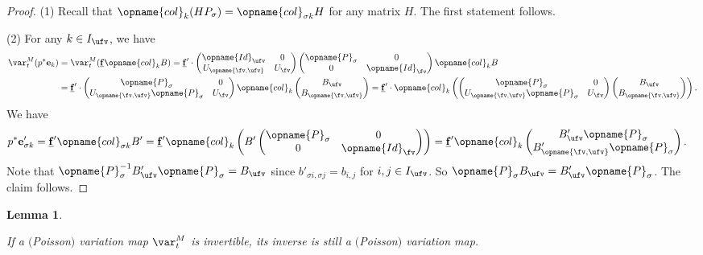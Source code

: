 \documentclass[pdftex]{sigma}
\newcommand{\Iufv}{I_{\ufv}}
\newcommand{\Id}{{\opname{Id}}}
\newcommand{\col}{\opname{col}}
\newcommand{\trans}{\opname{P}}
\newcommand{\ee}{\mathbf{e}}
\newcommand{\ff}{\mathbf{f}}
\newcommand{\uff}{\underline{\ff}}
\newcommand{\low}{\opname{\fv,\ufv}}
\numberwithin{equation}{section}
\newtheorem{Lemma}[Theorem]{Lemma}
\begin{document}
\begin{proof}

(1) Recall that $\col_{k}(HP_{\sigma})=\col_{\sigma k}H$ for any
matrix $H$. The first statement follows.

(2) For any $k\in\Iufv$, we have
\begin{align*}
\var_{t}^{M}(p^{*}\ee_{k}) & =\var_{t}^{M}(\uff\col_{k}B) =\uff'\cdot\begin{pmatrix}
\Id_{\ufv} & 0\\
U_{\low} & U_{\fv}
\end{pmatrix}\begin{pmatrix}
\trans_{\sigma} & 0\\
0 & \Id_{\fv}
\end{pmatrix}\col_{k}B\\
 & =\uff'\cdot\begin{pmatrix}
\trans_{\sigma} & 0\\
U_{\low}\trans_{\sigma} & U_{\fv}
\end{pmatrix}\col_{k}\begin{pmatrix}
B_{\ufv}\\
B_{\low}
\end{pmatrix} =\uff'\cdot\col_{k}\left(\begin{pmatrix}
\trans_{\sigma} & 0\\
U_{\low}\trans_{\sigma} & U_{\fv}
\end{pmatrix}\begin{pmatrix}
B_{\ufv}\\
B_{\low}
\end{pmatrix}\right).
\end{align*}
We have
\begin{align*}
p^{*}\ee_{\sigma k}' & =\uff'\col_{\sigma k}B' =\uff'\col_{k}\left(B'\begin{pmatrix}
\trans_{\sigma} & 0\\
0 & \Id_{\fv}
\end{pmatrix}\right) =\uff'\col_{k}\begin{pmatrix}
B'_{\ufv}\trans_{\sigma}\\
B'_{\low}\trans_{\sigma}
\end{pmatrix}.
\end{align*}
Note that $\trans_{\sigma}^{-1}B'_{\ufv}\trans_{\sigma}=B_{\ufv}$
since $b'_{\sigma i,\sigma j}=b_{i,j}$ for $i,j\in\Iufv$. So $\trans_{\sigma}B_{\ufv}=B'_{\ufv}\trans_{\sigma}$.
The claim follows.
\end{proof}

\begin{Lemma}\label{lem:inverse_M_variation}

If a $($Poisson$)$ variation map $\var_{t}^{M}$ is invertible, its inverse
is still a $($Poisson$)$ variation map.

\end{Lemma}
\end{document}
